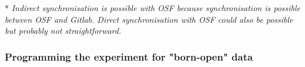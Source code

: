 \documentclass[a4paper,jou,natbib,floatsintext,donotrepeattitle]{apa6}
\begin{document}
\begin{table}[t]
\caption{Global overview of open experiment programming software's characteristics and synchronisation handling.}
\label{tab:softwares}
\vspace{1mm}
\begin{tablenotes}\footnotesize
\item[*] \textit{Indirect synchronisation is possible with OSF because synchronisation is possible between OSF and Gitlab. Direct synchronisation with OSF could also be possible but probably not straightforward.}
\end{tablenotes}
\label{tab:soft}
\end{table}

\subsubsection{Programming the experiment for "born-open" data}
\end{document}
